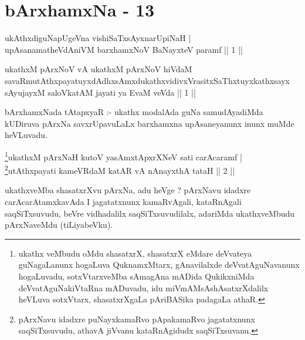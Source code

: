 \chapter{bArxhamxNa - 13}

\begin{shl}
ukAthxdiguNapUgeVna vishiSaTxsAyxnarUpiNaH  | \\
upAsanamatheVdAniVM barxhamxNoV BaNayxteV paramf \hfill ||  1 || 
\end{shl}

\begin{kandikeshl}
ukathxM pArxNoV vA ukathxM pArxNoV hiVdaM savaRmutAthxpayatuyxdAdhxsAmxdukathxvidivxVrasitxSaThxtuyxkathxsayx sAyujayxM saloVkatAM jayati ya EvaM veVda || 1 ||
\end{kandikeshl}

\begin{artha}
bArxhamxNada tAtapxyaR :- ukathx modalAda guNa samudAyadiMda kUDiruva pArxNa savxrUpavuLaLx barxhamxna upAsaneyanunx inunx muMde heVLuvadu.
\end{artha}


\begin{shl}
\footnote{ukathx veMbudu oMdu shasatxrX, shasatxrX eMdare deVvateya guNagaLanunx hogaLuva QuknamxMtarx, gAnavilalxde deVvatAguNavanunx hogaLuvadu, sotxVtarxveMba sAmagAna mADida QukikxniMda deVvatAguNakiVtaRna mADuvadu, idu miVmAMsAshAsatxrXdalilx heVLuva sotxVtarx, shasatxrXgaLa pAriBASika padagaLa athaR.}ukathxM pArxNaH kutoV yasAmxtApxrXNeV sati carAcaramf | \\
\footnote{pArxNavu idadxre puNayxkamaRvo pApakamaRvo jagatatxnunx saqSiTxsuvudu, athavA jiVvanu kataRnAgidudx saqSiTxsuvanu.}utAthxpayati kameVRdaM katAR vA nAnayxthA tataH \hfill ||  2 || 
\end{shl}

\begin{artha}
ukathxveMba shasatxrXvu pArxNa, adu heVge ? pArxNavu idadxre carAcarAtamxkavAda I jagatatxnunx kamaRvAgali, kataRnAgali saqSiTxsuvudu, beVre vidhadalilx saqSiTxsuvudilalx, adariMda ukathxveMbudu pArxNaveMdu (tiLiyabeVku).
\end{artha}

